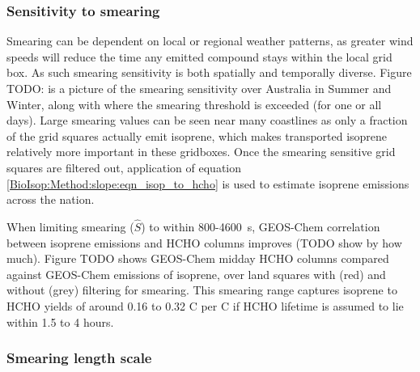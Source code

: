     
    
    

    \subsubsection{Sensitivity to smearing}
    
      Smearing can be dependent on local or regional weather patterns, as greater wind speeds will reduce the time any emitted compound stays within the local grid box.
      As such smearing sensitivity is both spatially and temporally diverse.
      Figure TODO: is a picture of the smearing sensitivity over Australia in Summer and Winter, along with where the smearing threshold is exceeded (for one or all days).
      Large smearing values can be seen near many coastlines as only a fraction of the grid squares actually emit isoprene, which makes transported isoprene relatively more important in these gridboxes.
      Once the smearing sensitive grid squares are filtered out, application of equation \ref{BioIsop:Method:slope:eqn_isop_to_hcho} is used to estimate isoprene emissions across the nation.
      
      
      
      When limiting smearing ($\hat{S}$) to within 800-4600~s, GEOS-Chem correlation between isoprene emissions and HCHO columns improves (TODO show by how much). 
      Figure TODO shows GEOS-Chem midday HCHO columns compared against GEOS-Chem emissions of isoprene, over land squares with (red) and without (grey) filtering for smearing.
      This smearing range captures isoprene to HCHO yields of around 0.16 to 0.32 C per C if HCHO lifetime is assumed to lie within 1.5 to 4 hours.
    
    \subsubsection{Smearing length scale}
    
